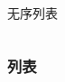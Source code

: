 {\begin{frame}[fragile]
\begin{columns}
\begin{column}{0.35\textwidth}
\begin{codeblock}[]{无序列表}
      \end{codeblock}
    \end{column}
    \begin{column}{0.35\textwidth}
    \end{column}
    \begin{column}{0.35\textwidth}
    \end{column}
  \end{columns}
\end{frame}


\begin{frame}
  \frametitle{列表}
  \begin{columns}
    \begin{column}{0.35\textwidth}
    \end{column}
    \begin{column}{0.35\textwidth}
    \end{column}
    \begin{column}{0.35\textwidth}
    \end{column}
  \end{columns}
\end{frame}

}

